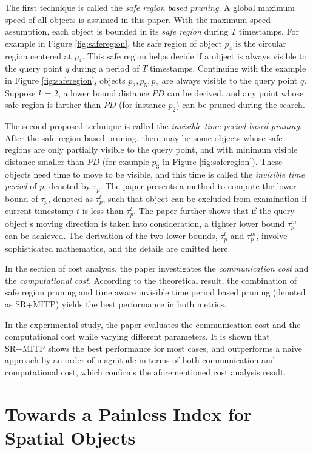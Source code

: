 \documentclass[paper=a4, fontsize=18pt]{article} %
\numberwithin{equation}{section} %
\numberwithin{figure}{section} %
\numberwithin{table}{section} %
\begin{document}
The first technique is called the \emph{safe region based pruning}. A global maximum speed of all objects is assumed in this paper. With the maximum speed assumption, each object is bounded in its \emph{safe region} during $T$ timestamps. For example in Figure \ref{fig:saferegion}, the safe region of object $p_4$ is the circular region centered at $p_4$. This safe region helps decide if a object is always visible to the query point $q$ during a period of $T$ timestamps. Continuing with the example in Figure \ref{fig:saferegion}, objects $p_2, p_5, p_6$ are always visible to the query point $q$. Suppose $k = 2$, a lower bound distance $PD$ can be derived, and any point whose safe region is farther than $PD$ (for instance $p_2$) can be pruned during the search.

The second proposed technique is called the \emph{invisible time period based pruning}. After the safe region based pruning, there may be some objects whose safe regions are only partially visible to the query point, and with minimum visible distance smaller than $PD$ (for example $p_3$ in Figure \ref{fig:saferegion}). These objects need time to move to be visible, and this time is called the \emph{invisible time period} of $p$, denoted by $\tau_p$. The paper presents a method to compute the lower bound of $\tau_p$, denoted as $\tau_p^l$, such that object can be excluded from examination if current timestamp $t$ is less than $\tau_p^l$. The paper further shows that if the query object's moving direction is taken into consideration, a tighter lower bound $\tau_p^m$ can be achieved. The derivation of the two lower bounds, $\tau_p^l$ and $\tau_p^m$, involve sophisticated mathematics, and the details are omitted here.

In the section of cost analysis, the paper investigates the \emph{communication cost} and the \emph{computational cost}. According to the theoretical result, the combination of safe region pruning and time aware invisible time period based pruning (denoted as SR+MITP) yields the best performance in both metrics.

In the experimental study, the paper evaluates the communication cost and the computational cost while varying different parameters. It is shown that SR+MITP shows the best performance for most cases, and outperforms a naive approach by an order of magnitude in terms of both communication and computational cost, which confirms the aforementioned cost analysis result.

\section{Towards a Painless Index for Spatial Objects \cite{ZQSH14}}
\end{document}
